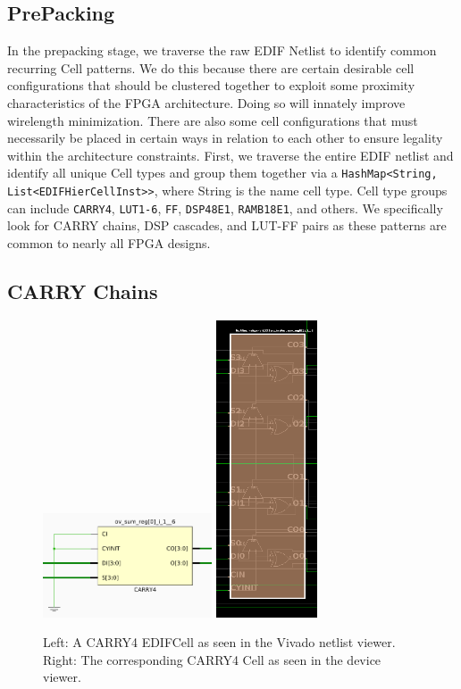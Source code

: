 \documentclass[twocolumn]{article}
\begin{document}
    \subsection{PrePacking}
        In the prepacking stage, we traverse the raw EDIF Netlist to identify common recurring Cell patterns. 
        We do this because there are certain desirable cell configurations that should be clustered together to exploit some proximity characteristics of the FPGA architecture. 
        Doing so will innately improve wirelength minimization. 
        There are also some cell configurations that must necessarily be placed in certain ways in relation to each other to ensure legality within the architecture constraints. 
        First, we traverse the entire EDIF netlist and identify all unique Cell types and group them together via a {\tt HashMap<String, List<EDIFHierCellInst>>}, where String is the name cell type. 
        Cell type groups can include {\tt CARRY4}, {\tt LUT1-6}, {\tt FF}, {\tt DSP48E1}, {\tt RAMB18E1}, and others. 
        We specifically look for CARRY chains, DSP cascades, and LUT-FF pairs as these patterns are common to nearly all FPGA designs. 

        \subsection{CARRY Chains}
            \begin{figure}[]
                \centering
                \includegraphics[width=5.0cm]{figures/carry_cell_edif.png}
                \includegraphics[width=3.0cm]{figures/carry_cell_device.png}
                \caption{
                    Left: A CARRY4 EDIFCell as seen in the Vivado netlist viewer.
                    Right: The corresponding CARRY4 Cell as seen in the device viewer.
                }
                \label{fig:carry_cell_edif}
            \end{figure}
\end{document}

